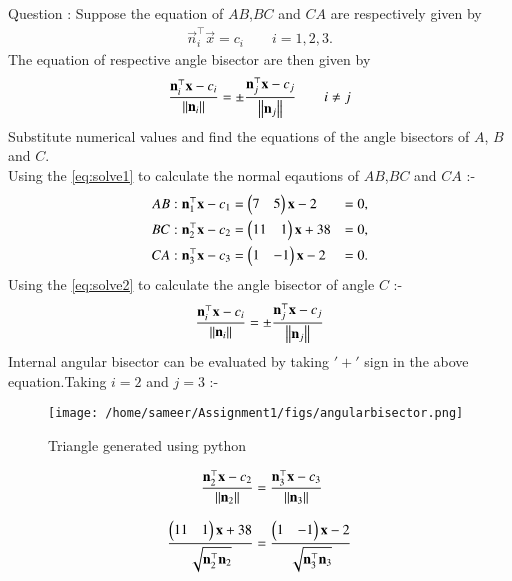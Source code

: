 \documentclass[journal,12pt,twocolumn]{IEEEtran}
\theoremstyle{remark}
\begin{document}
%
Question : Suppose the equation of $AB$,$BC$ and $CA$ are respectively given by 
\begin{align}
\label{eq:solve1}\vec{n}^{\top}_i\vec{x} = c_i\qquad i=1,2,3.
\end{align}
The equation of respective angle bisector are then given by 
\begin{align}
\label{eq:solve2}\dfrac{\mathbf{n}^{\top}_i\mathbf{x}-c_i}{\left\lVert\mathbf{n}_i\right\rVert} =  \pm\dfrac{\mathbf{n}^{\top}_j\mathbf{x}-c_j}{\left\lVert\mathbf{n}_j\right\rVert}\qquad i \neq j
\end{align}
Substitute numerical values and find the equations of the angle bisectors of $A$, $B$ and $C$.\\
\solution Using the \eqref{eq:solve1} to calculate the normal eqautions of $AB$,$BC$ and $CA$ :-
\begin{align}
AB :\mathbf{n}^{\top}_1\mathbf{x} - c_1  &=  \begin{pmatrix}7&5\end{pmatrix}\mathbf{x} - 2 &=0,\\
BC :\mathbf{n}^{\top}_2\mathbf{x} - c_2  &=  \begin{pmatrix}11&1\end{pmatrix}\mathbf{x} + 38 &=0,\\
CA :\mathbf{n}^{\top}_3\mathbf{x} - c_3  &=  \begin{pmatrix}1&-1\end{pmatrix}\mathbf{x} - 2 &=0.
\end{align}
Using the \eqref{eq:solve2} to calculate the angle bisector of angle $C$ :-
\begin{align}
\dfrac{\mathbf{n}^{\top}_i\mathbf{x}-c_i}{\left\lVert\mathbf{n}_i\right\rVert} =  \pm\dfrac{\mathbf{n}^{\top}_j\mathbf{x}-c_j}{\left\lVert\mathbf{n}_j\right\rVert}
\end{align}
Internal angular bisector can be evaluated by taking $'+'$ sign in the above equation.Taking $i=2$ and $j=3$ :-
\begin{figure}
\centering
\texttt{[image: /home/sameer/Assignment1/figs/angularbisector.png]}
\caption{Triangle generated using python}
\label{fig: Angular bisector}
\end{figure}
\begin{align}
\dfrac{\mathbf{n}^{\top}_2\mathbf{x}-c_2}{\left\lVert\mathbf{n}_2\right\rVert} &=  \dfrac{\mathbf{n}^{\top}_3\mathbf{x}-c_3}{\left\lVert\mathbf{n}_3\right\rVert}\\[8pt]
\dfrac{\begin{pmatrix}11 & 1\end{pmatrix}\mathbf{x}+38}{\sqrt{\mathbf{n}^{\top}_2\mathbf{n}_2}} &=  \dfrac{\begin{pmatrix}1 &-1\end{pmatrix}\mathbf{x}-2}{\sqrt{\mathbf{n}^{\top}_3 \mathbf{n}_3}}
\end{align}
\end{document}
